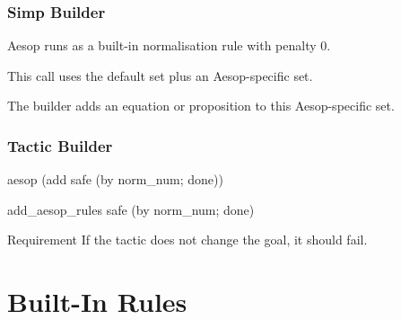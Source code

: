 \documentclass[xetex]{beamer}
\newcommand{\orange}[1]{\textcolor{orange}{#1}}
\newenvironment{rapppic}{\begin{tikzpicture}[outer sep=auto, level distance=2em]}{\end{tikzpicture}}
\newenvironment{rapp}{%
  \begin{tcolorbox}
  \begin{center}
  \begin{rapppic}
}{
  \end{rapppic}
  \end{center}
  \end{tcolorbox}%
}
\begin{document}

\begin{frame}
  \frametitle{Simp Builder}

  Aesop runs  as a built-in normalisation rule with penalty 0.

  This  call uses the default  set plus an
  Aesop-specific  set.

  The  builder adds an equation or proposition to this Aesop-specific
  set.
\end{frame}

\begin{frame}[fragile]
  \frametitle{Tactic Builder}

  \begin{leancode}
    aesop (add safe (by norm_num; done))
  \end{leancode}

  \pause

  \begin{leancode}
    add_aesop_rules safe (by norm_num; done)
  \end{leancode}

  \pause
  \bigskip

  \begin{block}{Requirement}
    If the tactic does not change the goal, it should fail.
  \end{block}
\end{frame}

\section{Built-In Rules}
\end{document}
